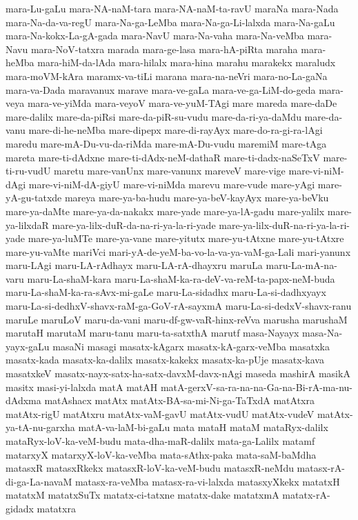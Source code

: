 {mara-Lu-gaLu
mara-NA-naM-tara
mara-NA-naM-ta-ravU
maraNa
mara-Nada
mara-Na-da-va-regU
mara-Na-ga-LeMba
mara-Na-ga-Li-lalxda
mara-Na-gaLu
mara-Na-kokx-La-gA-gada
mara-NavU
mara-Na-vaha
mara-Na-veMba
mara-Navu
mara-NoV-tatxra
marada
mara-ge-lasa
mara-hA-piRta
maraha
mara-heMba
mara-hiM-da-lAda
mara-hilalx
mara-hina
marahu
marakekx
maraludx
mara-moVM-kAra
maramx-va-tiLi
marana
mara-na-neVri
mara-no-La-gaNa
mara-va-Dada
maravanux
marave
mara-ve-gaLa
mara-ve-ga-LiM-do-geda
mara-veya
mara-ve-yiMda
mara-veyoV
mara-ve-yuM-TAgi
mare
mareda
mare-daDe
mare-dalilx
mare-da-piRsi
mare-da-piR-su-vudu
mare-da-ri-ya-daMdu
mare-da-vanu
mare-di-he-neMba
mare-dipepx
mare-di-rayAyx
mare-do-ra-gi-ra-lAgi
maredu
mare-mA-Du-vu-da-riMda
mare-mA-Du-vudu
maremiM
mare-tAga
mareta
mare-ti-dAdxne
mare-ti-dAdx-neM-dathaR
mare-ti-dadx-naSeTxV
mare-ti-ru-vudU
maretu
mare-vanUnx
mare-vanunx
mareveV
mare-vige
mare-vi-niM-dAgi
mare-vi-niM-dA-giyU
mare-vi-niMda
marevu
mare-vude
mare-yAgi
mare-yA-gu-tatxde
mareya
mare-ya-ba-hudu
mare-ya-beV-kayAyx
mare-ya-beVku
mare-ya-daMte
mare-ya-da-nakakx
mare-yade
mare-ya-lA-gadu
mare-yalilx
mare-ya-lilxdaR
mare-ya-lilx-duR-da-na-ri-ya-la-ri-yade
mare-ya-lilx-duR-na-ri-ya-la-ri-yade
mare-ya-luMTe
mare-ya-vane
mare-yitutx
mare-yu-tAtxne
mare-yu-tAtxre
mare-yu-vaMte
mariVci
mari-yA-de-yeM-ba-vo-la-va-ya-vaM-ga-Lali
mari-yanunx
maru-LAgi
maru-LA-rAdhayx
maru-LA-rA-dhayxru
maruLa
maru-La-mA-na-varu
maru-La-shaM-kara
maru-La-shaM-ka-ra-deV-va-reM-ta-papx-neM-buda
maru-La-shaM-ka-ra-sAvx-mi-gaLe
maru-La-sidadhx
maru-La-si-dadhxyayx
maru-La-si-dedhxV-shavx-raM-ga-GoV-rA-sayxmA
maru-La-si-dedxV-shavx-ranu
maruLe
maruLoV
maru-da-vani
maru-df-gw-vaR-hinx-reVva
marusha
marushaM
marutaH
marutaM
maru-tanu
maru-ta-satxthA
marutf
masa-Nayayx
masa-Na-yayx-gaLu
masaNi
masagi
masatx-kAgarx
masatx-kA-garx-veMba
masatxka
masatx-kada
masatx-ka-dalilx
masatx-kakekx
masatx-ka-pUje
masatx-kava
masatxkeV
masatx-nayx-satx-ha-satx-davxM-davx-nAgi
maseda
mashirA
masikA
masitx
masi-yi-lalxda
matA
matAH
matA-gerxV-sa-ra-na-na-Ga-na-Bi-rA-ma-nu-dAdxma
matAshacx
matAtx
matAtx-BA-sa-mi-Ni-ga-TaTxdA
matAtxra
matAtx-rigU
matAtxru
matAtx-vaM-gavU
matAtx-vudU
matAtx-vudeV
matAtx-ya-tA-nu-garxha
matA-va-laM-bi-gaLu
mata
mataH
mataM
mataRyx-dalilx
mataRyx-loV-ka-veM-budu
mata-dha-maR-dalilx
mata-ga-Lalilx
matamf
matarxyX
matarxyX-loV-ka-veMba
mata-sAthx-paka
mata-saM-baMdha
matasxR
matasxRkekx
matasxR-loV-ka-veM-budu
matasxR-neMdu
matasx-rA-di-ga-La-navaM
matasx-ra-veMba
matasx-ra-vi-lalxda
matasxyXkekx
matatxH
matatxM
matatxSuTx
matatx-ci-tatxne
matatx-dake
matatxmA
matatx-rA-gidadx
matatxra
}
